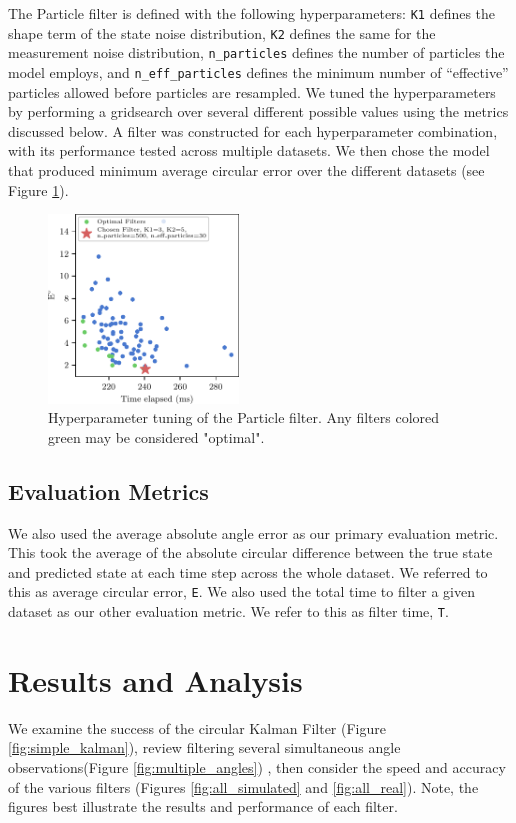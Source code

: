 \documentclass[11pt]{amsart}
\begin{document}
The Particle filter is defined with the following hyperparameters: \lstinline{K1} defines the shape term of the state noise distribution,  \lstinline{K2} defines the same for the measurement noise distribution, \lstinline{n_particles} defines the number of particles the model employs, and \lstinline{n_eff_particles} defines the minimum number of “effective” particles allowed before particles are resampled. We tuned the hyperparameters by performing a
gridsearch over several different possible values using the metrics discussed below. A filter was constructed for each hyperparameter
combination, with its performance tested across multiple datasets. We then chose the
model that produced minimum average circular error over the different datasets (see Figure \ref{fig:particle_hyperparam}).

\begin{figure}[htp]
    \centering
    \includegraphics[width=0.45\textwidth]{actual_paper_graphs/gridsearch_particle_filter.pdf}\hfill
    \caption{Hyperparameter tuning of the Particle filter. Any filters colored green may be considered "optimal".}
    \label{fig:particle_hyperparam}

\end{figure}

\subsection{Evaluation Metrics}
We also used the average absolute angle error as our primary evaluation metric. This took the average of the absolute circular difference between the true state and predicted state at each time step across the whole dataset. We referred to this as average circular error, \lstinline{E}. We also used the total time to filter a given dataset as our other evaluation metric. We refer to this as filter time, \lstinline{T}.

\section{Results and Analysis}
We examine the success of the circular Kalman Filter (Figure \ref{fig:simple_kalman}), 
review filtering several simultaneous angle observations(Figure \ref{fig:multiple_angles})
, then consider the speed and accuracy of the various filters (Figures \ref{fig:all_simulated} and \ref{fig:all_real}).
Note, the figures best illustrate the results and performance of each filter.
\end{document}
